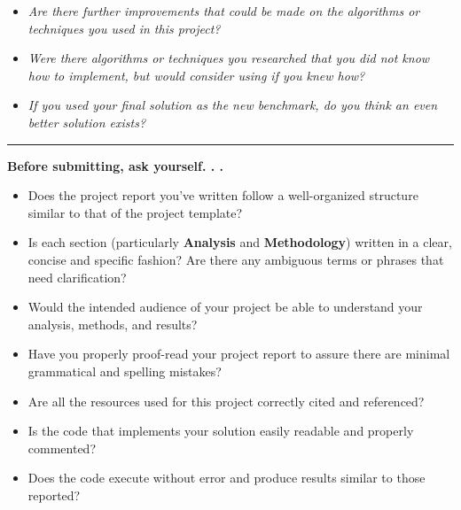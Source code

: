 \documentclass{article}
\begin{document}
\begin{itemize}
\item
  \emph{Are there further improvements that could be made on the
  algorithms or techniques you used in this project?}
\item
  \emph{Were there algorithms or techniques you researched that you did
  not know how to implement, but would consider using if you knew how?}
\item
  \emph{If you used your final solution as the new benchmark, do you
  think an even better solution exists?}
\end{itemize}

\begin{center}\rule{0.5\linewidth}{\linethickness}\end{center}

\textbf{Before submitting, ask yourself. . .}

\begin{itemize}
\item
  Does the project report you've written follow a well-organized
  structure similar to that of the project template?
\item
  Is each section (particularly \textbf{Analysis} and
  \textbf{Methodology}) written in a clear, concise and specific
  fashion? Are there any ambiguous terms or phrases that need
  clarification?
\item
  Would the intended audience of your project be able to understand your
  analysis, methods, and results?
\item
  Have you properly proof-read your project report to assure there are
  minimal grammatical and spelling mistakes?
\item
  Are all the resources used for this project correctly cited and
  referenced?
\item
  Is the code that implements your solution easily readable and properly
  commented?
\item
  Does the code execute without error and produce results similar to
  those reported?
\end{itemize}

\newpage
\printbibliography
\end{document}
